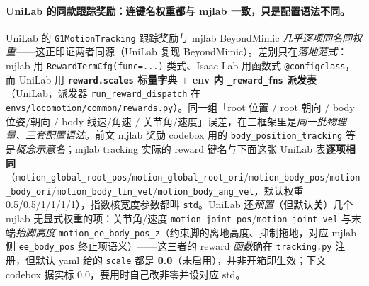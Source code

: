 \paragraph{UniLab 的同款跟踪奖励：连键名权重都与 mjlab 一致，只是配置语法不同。}UniLab 的 \verb|G1MotionTracking| 跟踪奖励与 mjlab BeyondMimic \emph{几乎逐项同名同权重}——这正印证两者同源（UniLab 复现 BeyondMimic）。差别只在\emph{落地范式}：mjlab 用 \verb|RewardTermCfg(func=...)| 类式、Isaac Lab 用函数式 \verb|@configclass|，而 UniLab 用 \textbf{\texttt{reward.scales} 标量字典 $+$ env 内 \texttt{\_reward\_fns} 派发表}（UniLab，派发器 \verb|run_reward_dispatch| 在 \verb|envs/locomotion/common/rewards.py|）。同一组「root 位置 $/$ root 朝向 $/$ body 位姿/朝向 $/$ body 线速/角速 $/$ 关节角/速度」误差，在三框架里是\emph{同一批物理量、三套配置语法}。前文 mjlab 奖励 codebox 用的 \texttt{body\_position\_tracking} 等是\emph{概念示意名}；mjlab tracking 实际的 reward 键名与下面这张 UniLab 表\textbf{逐项相同}（\texttt{motion\_global\_root\_pos}/\texttt{motion\_global\_root\_ori}/\texttt{motion\_body\_pos}/\texttt{motion\_body\_ori}/\texttt{motion\_body\_lin\_vel}/\texttt{motion\_body\_ang\_vel}，默认权重 0.5/0.5/1/1/1/1），指数核宽度参数都叫 \texttt{std}。UniLab 还\emph{预置}（但默认\textbf{关}）几个 mjlab 无显式权重的项：关节角/速度 \verb|motion_joint_pos|/\verb|motion_joint_vel| 与末端\emph{抬脚高度} \verb|motion_ee_body_pos_z|（约束脚的离地高度、抑制拖地，对应 mjlab 侧 \verb|ee_body_pos| 终止项语义）——这三者的 reward \emph{函数}确在 \verb|tracking.py| 注册，但默认 yaml 给的 \verb|scale| 都是 \textbf{0.0}（未启用），并非开箱即生效；下文 codebox 据实标 0.0，要用时自己改非零并设对应 std。

